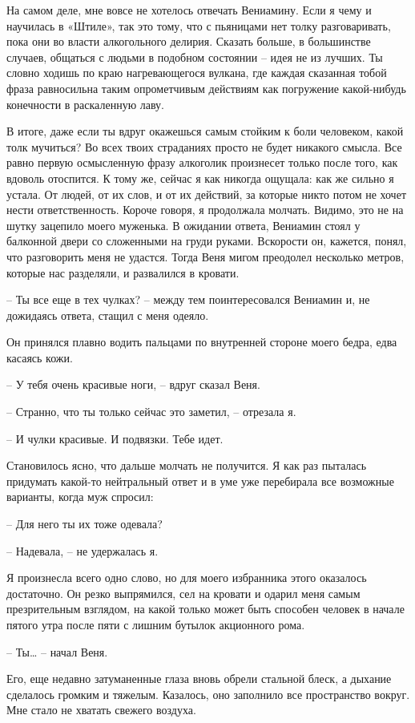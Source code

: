 \documentclass[
]{book}
\begin{document}
На самом деле, мне вовсе не хотелось отвечать Вениамину. Если я чему и научилась в «Штиле», так это тому, что с пьяницами нет толку разговаривать, пока они во власти алкогольного делирия. Сказать больше, в большинстве случаев, общаться с людьми в подобном состоянии -- идея не из лучших. Ты словно ходишь по краю нагревающегося вулкана, где каждая сказанная тобой фраза равносильна таким опрометчивым действиям как погружение какой-нибудь конечности в раскаленную лаву.

В итоге, даже если ты вдруг окажешься самым стойким к боли человеком, какой толк мучиться? Во всех твоих страданиях просто не будет никакого смысла. Все равно первую осмысленную фразу алкоголик произнесет только после того, как вдоволь отоспится. К тому же, сейчас я как никогда ощущала: как же сильно я устала. От людей, от их слов, и от их действий, за которые никто потом не хочет нести ответственность. Короче говоря, я продолжала молчать. Видимо, это не на шутку зацепило моего муженька. В ожидании ответа, Вениамин стоял у балконной двери со сложенными на груди руками. Вскорости он, кажется, понял, что разговорить меня не удастся. Тогда Веня мигом преодолел несколько метров, которые нас разделяли, и развалился в кровати.

-- Ты все еще в тех чулках? -- между тем поинтересовался Вениамин и, не дожидаясь ответа, стащил с меня одеяло.

Он принялся плавно водить пальцами по внутренней стороне моего бедра, едва касаясь кожи.

-- У тебя очень красивые ноги, -- вдруг сказал Веня.

-- Странно, что ты только сейчас это заметил, -- отрезала я.

-- И чулки красивые. И подвязки. Тебе идет.

Становилось ясно, что дальше молчать не получится. Я как раз пыталась придумать какой-то нейтральный ответ и в уме уже перебирала все возможные варианты, когда муж спросил:

-- Для него ты их тоже одевала?

-- Надевала, -- не удержалась я.

Я произнесла всего одно слово, но для моего избранника этого оказалось достаточно. Он резко выпрямился, сел на кровати и одарил меня самым презрительным взглядом, на какой только может быть способен человек в начале пятого утра после пяти с лишним бутылок акционного рома.

-- Ты\ldots{} -- начал Веня.

Его, еще недавно затуманенные глаза вновь обрели стальной блеск, а дыхание сделалось громким и тяжелым. Казалось, оно заполнило все пространство вокруг. Мне стало не хватать свежего воздуха.
\end{document}
